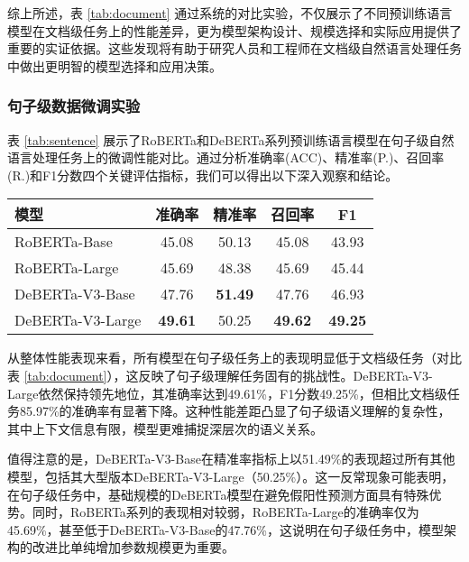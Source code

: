 综上所述，表 \ref{tab:document} 通过系统的对比实验，不仅展示了不同预训练语言模型在文档级任务上的性能差异，更为模型架构设计、规模选择和实际应用提供了重要的实证依据。这些发现将有助于研究人员和工程师在文档级自然语言处理任务中做出更明智的模型选择和应用决策。

\subsubsection{句子级数据微调实验}

表 \ref{tab:sentence} 展示了RoBERTa和DeBERTa系列预训练语言模型在句子级自然语言处理任务上的微调性能对比。通过分析准确率(ACC)、精准率(P.)、召回率(R.)和F1分数四个关键评估指标，我们可以得出以下深入观察和结论。

\begin{table*}[htbp]
\caption{RoBERTa 和 DeBERTa 在句子级数据上微调结果}
\centering
\begin{tabular}{l|cccc}
\toprule
\textbf{模型}& \textbf{准确率}   & \textbf{精准率}    & \textbf{召回率}    & \textbf{F1}   \\ \midrule
RoBERTa-Base \cite{liu_roberta_2019}     & 45.08          & 50.13          & 45.08          & 43.93          \\
RoBERTa-Large \cite{liu_roberta_2019}    & 45.69          & 48.38          & 45.69          & 45.44          \\
DeBERTa-V3-Base \cite{he2023debertav3improvingdebertausing} & 47.76          & \textbf{51.49} & 47.76          & 46.93          \\
DeBERTa-V3-Large \cite{he2023debertav3improvingdebertausing} & \textbf{49.61} & 50.25          & \textbf{49.62} & \textbf{49.25} \\ \bottomrule
\end{tabular}
\label{tab:sentence}
\end{table*}

从整体性能表现来看，所有模型在句子级任务上的表现明显低于文档级任务（对比表 \ref{tab:document}），这反映了句子级理解任务固有的挑战性。DeBERTa-V3-Large依然保持领先地位，其准确率达到49.61\%，F1分数49.25\%，但相比文档级任务85.97\%的准确率有显著下降。这种性能差距凸显了句子级语义理解的复杂性，其中上下文信息有限，模型更难捕捉深层次的语义关系。

值得注意的是，DeBERTa-V3-Base在精准率指标上以51.49\%的表现超过所有其他模型，包括其大型版本DeBERTa-V3-Large（50.25\%）。这一反常现象可能表明，在句子级任务中，基础规模的DeBERTa模型在避免假阳性预测方面具有特殊优势。同时，RoBERTa系列的表现相对较弱，RoBERTa-Large的准确率仅为45.69\%，甚至低于DeBERTa-V3-Base的47.76\%，这说明在句子级任务中，模型架构的改进比单纯增加参数规模更为重要。


